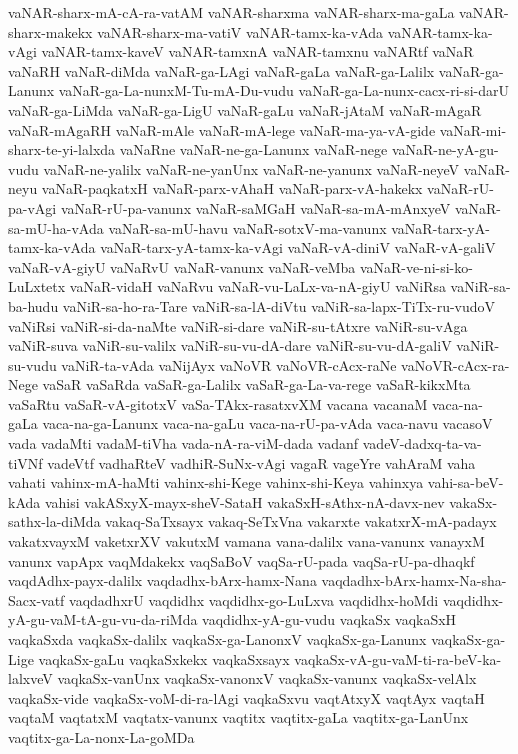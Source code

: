 {vaNAR-sharx-mA-cA-ra-vatAM
vaNAR-sharxma
vaNAR-sharx-ma-gaLa
vaNAR-sharx-makekx
vaNAR-sharx-ma-vatiV
vaNAR-tamx-ka-vAda
vaNAR-tamx-ka-vAgi
vaNAR-tamx-kaveV
vaNAR-tamxnA
vaNAR-tamxnu
vaNARtf
vaNaR
vaNaRH
vaNaR-diMda
vaNaR-ga-LAgi
vaNaR-gaLa
vaNaR-ga-Lalilx
vaNaR-ga-Lanunx
vaNaR-ga-La-nunxM-Tu-mA-Du-vudu
vaNaR-ga-La-nunx-cacx-ri-si-darU
vaNaR-ga-LiMda
vaNaR-ga-LigU
vaNaR-gaLu
vaNaR-jAtaM
vaNaR-mAgaR
vaNaR-mAgaRH
vaNaR-mAle
vaNaR-mA-lege
vaNaR-ma-ya-vA-gide
vaNaR-mi-sharx-te-yi-lalxda
vaNaRne
vaNaR-ne-ga-Lanunx
vaNaR-nege
vaNaR-ne-yA-gu-vudu
vaNaR-ne-yalilx
vaNaR-ne-yanUnx
vaNaR-ne-yanunx
vaNaR-neyeV
vaNaR-neyu
vaNaR-paqkatxH
vaNaR-parx-vAhaH
vaNaR-parx-vA-hakekx
vaNaR-rU-pa-vAgi
vaNaR-rU-pa-vanunx
vaNaR-saMGaH
vaNaR-sa-mA-mAnxyeV
vaNaR-sa-mU-ha-vAda
vaNaR-sa-mU-havu
vaNaR-sotxV-ma-vanunx
vaNaR-tarx-yA-tamx-ka-vAda
vaNaR-tarx-yA-tamx-ka-vAgi
vaNaR-vA-diniV
vaNaR-vA-galiV
vaNaR-vA-giyU
vaNaRvU
vaNaR-vanunx
vaNaR-veMba
vaNaR-ve-ni-si-ko-LuLxtetx
vaNaR-vidaH
vaNaRvu
vaNaR-vu-LaLx-va-nA-giyU
vaNiRsa
vaNiR-sa-ba-hudu
vaNiR-sa-ho-ra-Tare
vaNiR-sa-lA-diVtu
vaNiR-sa-lapx-TiTx-ru-vudoV
vaNiRsi
vaNiR-si-da-naMte
vaNiR-si-dare
vaNiR-su-tAtxre
vaNiR-su-vAga
vaNiR-suva
vaNiR-su-valilx
vaNiR-su-vu-dA-dare
vaNiR-su-vu-dA-galiV
vaNiR-su-vudu
vaNiR-ta-vAda
vaNijAyx
vaNoVR
vaNoVR-cAcx-raNe
vaNoVR-cAcx-ra-Nege
vaSaR
vaSaRda
vaSaR-ga-Lalilx
vaSaR-ga-La-va-rege
vaSaR-kikxMta
vaSaRtu
vaSaR-vA-gitotxV
vaSa-TAkx-rasatxvXM
vacana
vacanaM
vaca-na-gaLa
vaca-na-ga-Lanunx
vaca-na-gaLu
vaca-na-rU-pa-vAda
vaca-navu
vacasoV
vada
vadaMti
vadaM-tiVha
vada-nA-ra-viM-dada
vadanf
vadeV-dadxq-ta-va-tiVNf
vadeVtf
vadhaRteV
vadhiR-SuNx-vAgi
vagaR
vageYre
vahAraM
vaha
vahati
vahinx-mA-haMti
vahinx-shi-Kege
vahinx-shi-Keya
vahinxya
vahi-sa-beV-kAda
vahisi
vakASxyX-mayx-sheV-SataH
vakaSxH-sAthx-nA-davx-nev
vakaSx-sathx-la-diMda
vakaq-SaTxsayx
vakaq-SeTxVna
vakarxte
vakatxrX-mA-padayx
vakatxvayxM
vaketxrXV
vakutxM
vamana
vana-dalilx
vana-vanunx
vanayxM
vanunx
vapApx
vaqMdakekx
vaqSaBoV
vaqSa-rU-pada
vaqSa-rU-pa-dhaqkf
vaqdAdhx-payx-dalilx
vaqdadhx-bArx-hamx-Nana
vaqdadhx-bArx-hamx-Na-sha-Sacx-vatf
vaqdadhxrU
vaqdidhx
vaqdidhx-go-LuLxva
vaqdidhx-hoMdi
vaqdidhx-yA-gu-vaM-tA-gu-vu-da-riMda
vaqdidhx-yA-gu-vudu
vaqkaSx
vaqkaSxH
vaqkaSxda
vaqkaSx-dalilx
vaqkaSx-ga-LanonxV
vaqkaSx-ga-Lanunx
vaqkaSx-ga-Lige
vaqkaSx-gaLu
vaqkaSxkekx
vaqkaSxsayx
vaqkaSx-vA-gu-vaM-ti-ra-beV-ka-lalxveV
vaqkaSx-vanUnx
vaqkaSx-vanonxV
vaqkaSx-vanunx
vaqkaSx-velAlx
vaqkaSx-vide
vaqkaSx-voM-di-ra-lAgi
vaqkaSxvu
vaqtAtxyX
vaqtAyx
vaqtaH
vaqtaM
vaqtatxM
vaqtatx-vanunx
vaqtitx
vaqtitx-gaLa
vaqtitx-ga-LanUnx
vaqtitx-ga-La-nonx-La-goMDa
}
